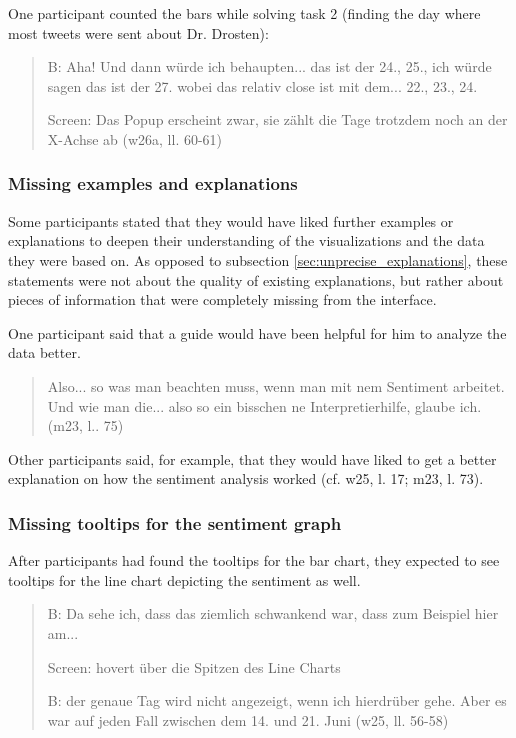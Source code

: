 One participant counted the bars while solving task 2 (finding the day where most tweets were sent about Dr. Drosten):

\begin{quote}
    B: Aha! Und dann würde ich behaupten... das ist der 24., 25., ich würde sagen das ist der 27. wobei das relativ close ist mit dem... 22., 23., 24. 

    Screen: Das Popup erscheint zwar, sie zählt die Tage trotzdem noch an der X-Achse ab (w26a, ll. 60-61)
\end{quote}

\subsubsection*{Missing examples and explanations}
Some participants stated that they would have liked further examples or explanations to deepen their understanding of the visualizations and the data they were based on. As opposed to subsection \ref{sec:unprecise_explanations},  these statements were not about the quality of existing explanations, but rather about pieces of information that were completely missing from the interface.

One participant said that a guide would have been helpful for him to analyze the data better.

\begin{quote}
    Also... so was man beachten muss, wenn man mit nem Sentiment arbeitet. Und wie man die... also so ein bisschen ne Interpretierhilfe, glaube ich. (m23, l.. 75)
\end{quote}

Other participants said, for example, that they would have liked to get a better explanation on how the sentiment analysis worked (cf. w25, l. 17; m23, l. 73).

\subsubsection*{Missing tooltips for the sentiment graph}
After participants had found the tooltips for the bar chart, they expected to see tooltips for the line chart depicting the sentiment as well.

\begin{quote}
    B: Da sehe ich, dass das ziemlich schwankend war, dass zum Beispiel hier am... 

Screen: hovert über die Spitzen des Line Charts

B: der genaue Tag wird nicht angezeigt, wenn ich hierdrüber gehe. Aber es war auf jeden Fall zwischen dem 14. und 21. Juni (w25, ll. 56-58)
\end{quote}

